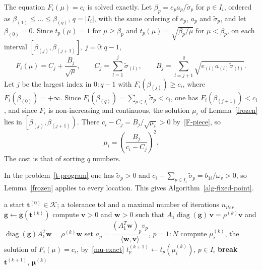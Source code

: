 \documentclass[11pt]{article}
\theoremstyle{plain}
\theoremstyle{definition}
\theoremstyle{remark}
\numberwithin{equation}{section}
\numberwithin{figure}{section}
\numberwithin{table}{section}
\numberwithin{algorithm}{section}
\begin{document}
The equation $F_i(\mu)=c_i$ is solved exactly. Let
$\beta_p=e_pa_p/\widetilde\sigma_p$ for $p\in I_i$, ordered as
$\beta_{(1)}\le\dots\le\beta_{(q)}$, $q=|I_i|$, with the same ordering of
$e_p$, $a_p$ and $\widetilde\sigma_p$, and let $\beta_{(0)}=0$. Since $t_p(\mu)=1$ for
$\mu\ge\beta_p$ and $t_p(\mu)=\sqrt{\beta_p/\mu}$ for $\mu<\beta_p$, on each
interval $\left[\beta_{(j)},\beta_{(j+1)}\right]$, $j=0:q-1$,
\begin{equation}\label{F-piece}
F_i(\mu)=C_j+\frac{B_j}{\sqrt\mu},\qquad
C_j=\sum_{l=1}^{j}\widetilde\sigma_{(l)},\qquad
B_j=\sum_{l=j+1}^{q}\sqrt{e_{(l)}a_{(l)}\widetilde\sigma_{(l)}} .
\end{equation}
Let $j$ be the largest index in $0:q-1$ with $F_i\left(\beta_{(j)}\right)\ge c_i$,
where $F_i\left(\beta_{(0)}\right)=+\infty$. Since
$F_i\left(\beta_{(q)}\right)=\sum_{p\in I_i}\widetilde\sigma_p<c_i$, one has
$F_i\left(\beta_{(j+1)}\right)<c_i$, and since $F_i$ is non-increasing and
continuous, the solution $\mu_i$ of Lemma~\ref{frozen} lies in
$\left[\beta_{(j)},\beta_{(j+1)}\right)$. There $c_i-C_j=B_j/\sqrt{\mu_i}>0$
by~\eqref{F-piece}, so
\begin{equation}\label{mu-exact}
\mu_i=\left(\frac{B_j}{c_i-C_j}\right)^2 .
\end{equation}
The cost is that of sorting $q$ numbers.

In the problem~\eqref{t-program} one has $\widetilde\sigma_p>0$ and
$c_i-\sum_{p\in I_i}\widetilde\sigma_p=b_{1i}/\omega_v>0$, so
Lemma~\ref{frozen} applies to every location. This gives
Algorithm~\ref{alg-fixed-point}.

\begin{algorithm}[ht]
\caption{Fixed point iteration for~\eqref{kkt}}\label{alg-fixed-point}
\begin{algorithmic}[1]
\Require a start $\bm t^{(0)}\in\mathcal{K}$; a tolerance $\mathrm{tol}$ and a
maximal number of iterations $n_{iter}$
  \State $\bm g\gets\bm g\left(\bm t^{(k)}\right)$
  \State compute $\bm v>0$ and $\bm w>0$ such that
  $A_1\operatorname{diag}(\bm g)\,\bm v=\rho^{(k)}\bm v$ and
  $\operatorname{diag}(\bm g)A_1^T\bm w=\rho^{(k)}\bm w$
  \State set $a_p=\dfrac{\left(A_1^T\bm w\right)_pv_p}{\langle\bm w,\bm v\rangle}$, $p=1:N$
    \State compute $\mu_i^{(k)}$, the solution of $F_i(\mu)=c_i$, by~\eqref{mu-exact}
    \State $t_p^{(k+1)}\gets t_p\left(\mu_i^{(k)}\right)$, $p\in I_i$
  \EndFor
    \State \textbf{break}
  \EndIf
\EndFor
\State \Return $\bm t^{(k+1)}$, $\bm\mu^{(k)}$
\end{algorithmic}
\end{algorithm}
\end{document}
